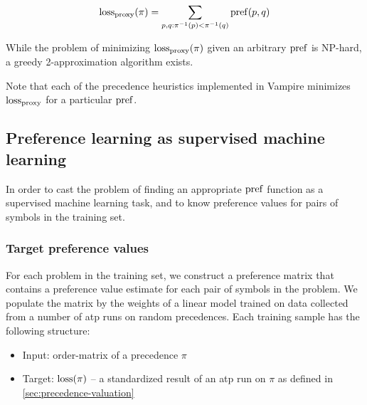 \begin{align*}
\proxy_loss(\pi) = \sum_{p, q: \inv{\pi}(p) < \inv{\pi}(q)} \pref(p, q)
\end{align*}

While the problem of minimizing \(\proxy_loss(\pi)\) given an arbitrary \(\operatorname{pref}\) is NP-hard,
a greedy 2-approximation algorithm exists.\cite{Cohen2011}

Note that each of the precedence heuristics implemented in Vampire minimizes \(\proxy_loss\)
for a particular \(\operatorname{pref}\).

\subsection{Preference learning as supervised machine learning}

In order to cast the problem of finding an appropriate \(\operatorname{pref}\) function
as a supervised machine learning task,
and to know preference values for pairs of symbols in the training set.

\subsubsection{Target preference values}

For each problem in the training set, we construct a preference matrix that contains a preference
value estimate for each pair of symbols in the problem.
We populate the matrix by the weights of a linear model trained on data
collected from a number of \gls{atp} runs on random precedences.
Each training sample has the following structure:

\begin{itemize}
	\item Input: \Gls{order-matrix} of a precedence \(\pi\)
	\item Target: \(\operatorname{loss}(\pi)\) --
	a standardized result of an \gls{atp} run on \(\pi\) as defined in \autoref{sec:precedence-valuation}
\end{itemize}

